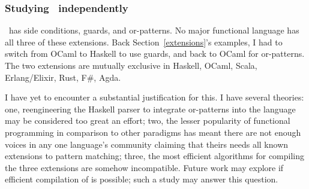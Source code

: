 \documentclass[manuscript,screen,review, 12pt, nonacm]{acmart}
\begin{document}

            
            
            



        \subsubsection{Studying \PPlus\ independently}
        \label{pplusindependently}
        \PPlus\ has side conditions, guards, and or-patterns. No major
        functional language has all three of these extensions. Back
        Section~\ref{extensions}'s examples, I had to switch from OCaml to
        Haskell to use guards, and back to OCaml for or-patterns. The two
        extensions are mutually exclusive in Haskell, OCaml, Scala,
        Erlang/Elixir, Rust, F\#, Agda.~\cite{haskell, ocaml, scala, erlang,
        elixir, rust, fsharp, agda}

        I have yet to encounter a substantial justification for this. I have
        several theories: one, reengineering the Haskell parser to integrate
        or-patterns into the language may be considered too great an effort;
        two, the lesser popularity of functional programming in comparison to
        other paradigms has meant there are not enough voices in any one
        language's community claiming that theirs needs all known extensions to
        pattern matching; three, the most efficient algorithms for compiling the
        three extensions are somehow incompatible. Future work may explore if
        efficient compilation of \PPlus is possible; such a study may answer this
        question. 
\end{document}
